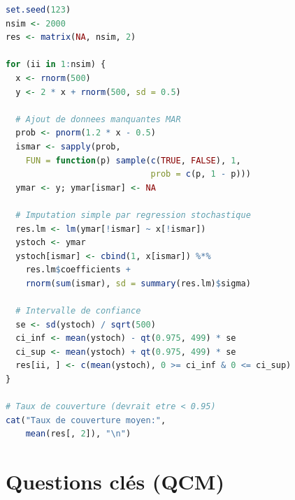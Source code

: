 \documentclass[a4paper,11pt]{article}
\theoremstyle{definition}
\theoremstyle{remark}
\begin{document}
\begin{lstlisting}[language=R, caption=Codes pour simuler l'impact de l'imputation simple]
set.seed(123)
nsim <- 2000
res <- matrix(NA, nsim, 2)

for (ii in 1:nsim) {
  x <- rnorm(500)
  y <- 2 * x + rnorm(500, sd = 0.5)

  # Ajout de donnees manquantes MAR
  prob <- pnorm(1.2 * x - 0.5)
  ismar <- sapply(prob,
    FUN = function(p) sample(c(TRUE, FALSE), 1,
                             prob = c(p, 1 - p)))
  ymar <- y; ymar[ismar] <- NA

  # Imputation simple par regression stochastique
  res.lm <- lm(ymar[!ismar] ~ x[!ismar])
  ystoch <- ymar
  ystoch[ismar] <- cbind(1, x[ismar]) %*%
    res.lm$coefficients +
    rnorm(sum(ismar), sd = summary(res.lm)$sigma)

  # Intervalle de confiance
  se <- sd(ystoch) / sqrt(500)
  ci_inf <- mean(ystoch) - qt(0.975, 499) * se
  ci_sup <- mean(ystoch) + qt(0.975, 499) * se
  res[ii, ] <- c(mean(ystoch), 0 >= ci_inf & 0 <= ci_sup)
}

# Taux de couverture (devrait etre < 0.95)
cat("Taux de couverture moyen:",
    mean(res[, 2]), "\n")
\end{lstlisting}

\section*{Questions clés (QCM)}

\end{document}
